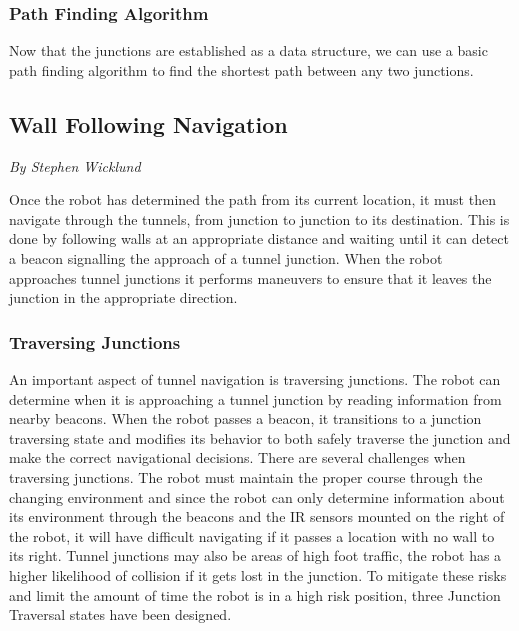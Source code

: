 \documentclass[12pt]{report}
\newcommand{\sectionAuthor}[1]{{\small\vspace{-1em}\textit{#1}}\bigskip\par}
\begin{document}
\subsubsection{Path Finding Algorithm}
Now that the junctions are established as a data structure, we can use a basic path finding algorithm to find the shortest path between any two junctions.

\subsection{Wall Following Navigation}
\sectionAuthor{By Stephen Wicklund}

Once the robot has determined the path from its current location, it must then navigate through the tunnels, from junction to junction to its destination. This is done by following walls at an appropriate distance and waiting until it can detect a beacon signalling the approach of a tunnel junction. When the robot approaches tunnel junctions it performs maneuvers to ensure that it leaves the junction in the appropriate direction.

\subsubsection{Traversing Junctions}
An important aspect of tunnel navigation is traversing junctions. The robot can determine when it is approaching a tunnel junction by reading information from nearby beacons. When the robot passes a beacon, it transitions to a junction traversing state and modifies its behavior to both safely traverse the junction and make the correct navigational decisions. There are several challenges when traversing junctions. The robot must maintain the proper course through the changing environment and since the robot can only determine information about its environment through the beacons and the IR sensors mounted on the right of the robot, it will have difficult navigating if it passes a location with no wall to its right. Tunnel junctions may also be areas of high foot traffic, the robot has a higher likelihood of collision if it gets lost in the junction. To mitigate these risks and limit the amount of time the robot is in a high risk position, three Junction Traversal states have been designed.
\end{document}
